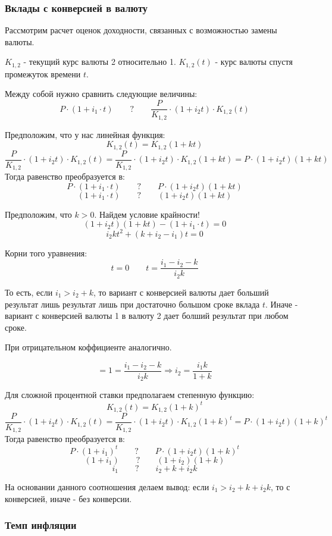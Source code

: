 \documentclass[aps,%
12pt,%
final,%
oneside,
onecolumn,%
musixtex, %
superscriptaddress,%
centertags]{article} %
\begin{document}
\subsubsection{Вклады с конверсией в валюту}

Рассмотрим расчет оценок доходности, связанных с возможностью замены валюты.

$K_{1,2}$ - текущий курс валюты 2 относительно 1. $K_{1,2}(t)$ - курс валюты спустя промежуток времени $t$. 

Между собой нужно сравнить следующие величины:
$$P \cdot (1+i_1 \cdot t) \qquad ? \qquad \frac{P}{K_{1,2}} \cdot (1 + i_2 t) \cdot K_{1,2}(t) $$

Предположим, что у нас линейная функция:
$$K_{1,2}(t) = K_{1,2} (1 + kt)$$
$$\frac{P}{K_{1,2}} \cdot (1 + i_2 t) \cdot K_{1,2}(t) = \frac{P}{K_{1,2}} \cdot (1 + i_2 t) \cdot K_{1,2} (1 + kt) = P \cdot (1 + i_2 t) (1 + kt)$$
Тогда равенство преобразуется в:
$$P \cdot (1+i_1 \cdot t) \qquad ? \qquad P \cdot (1 + i_2 t) (1 + kt)$$
$$(1+i_1 \cdot t) \qquad ? \qquad  (1 + i_2 t) (1 + kt)$$

Предположим, что $k>0$. Найдем условие крайности!
$$(1 + i_2 t) (1 + kt) - (1+i_1 \cdot t) = 0$$
$$i_2kt^2 + (k+i_2-i_1)t = 0$$

Корни того уравнения:
$$t=0 \qquad t=\frac{i_1-i_2-k}{i_2k}$$

То есть, если $i_1 >i_2+k$, то вариант с конверсией валюты дает больший результат лишь результат лишь при достаточно большом сроке вклада $t$. Иначе - вариант с конверсией валюты 1 в валюту 2 дает болший результат при любом сроке.

При отрицательном коффициенте аналогично.

$$ = 1 = \frac{i_1-i_2-k}{i_2k} \Rightarrow i_2 = \frac{i_1k}{1+k}$$

Для сложной процентной ставки предполагаем степенную функцию:
$$K_{1,2}(t) = K_{1,2} (1 + k)^t$$
$$\frac{P}{K_{1,2}} \cdot (1 + i_2 t) \cdot K_{1,2}(t) = \frac{P}{K_{1,2}} \cdot (1 + i_2 t) \cdot K_{1,2} (1 + k)^t = P \cdot (1 + i_2 t) (1 + k)^t$$
Тогда равенство преобразуется в:
$$P \cdot (1+i_1)^t \qquad ? \qquad P \cdot (1 + i_2 t) (1 + k)^t$$
$$(1+i_1) \qquad ? \qquad  (1 + i_2) (1 + k)$$
$$ i_1 \qquad ? \qquad i_2 + k + i_2 k$$

На основании данного соотношения делаем вывод: если $i_1 > i_2 + k + i_2k$, то с конверсией, иначе - без конверсии.

\subsubsection{Темп инфляции}
\end{document}
